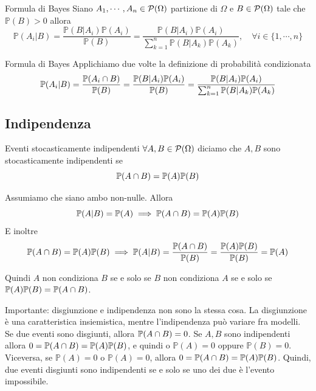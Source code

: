 \documentclass[a4paper]{article}
\begin{document}
\begin{snippettheorem}{Formula di Bayes}
    Siano \(A_1, \cdots, A_n \in \mathcal P(\Omega)\) partizione di \(\Omega\)
    e \(B \in \mathcal P(\Omega)\) tale che \(\mathbb P(B) > 0\) allora
    \[
        \mathbb P(A_i | B) = \frac{
            \mathbb P(B | A_i) \mathbb P(A_i)
        }{
            \mathbb P(B)
        } = \frac{
            \mathbb P(B|A_i) \mathbb P(A_i)
        }{
            \sum_{k=1}^n \mathbb P(B | A_k) \mathbb P(A_k)
        }, \quad \forall i \in \{1, \cdots, n\}
    \]
\end{snippettheorem}

\begin{snippetproof}{Formula di Bayes}
    Applichiamo due volte la definizione di probabilità condizionata
    \[
        \mathbb P(A_i | B) =
        \frac{
            \mathbb P(A_i \cap B)
        }{
            \mathbb P(B)
        } = \frac{
            \mathbb P(B | A_i) \mathbb P(A_i)
        }{
            \mathbb P(B)
        } = \frac{
            \mathbb P(B|A_i)\mathbb P(A_i)
        }{
            \sum_{k=1}^n \mathbb P(B|A_k)\mathbb P(A_k)
        }
    \]
\end{snippetproof}

\subsection{Indipendenza}

\begin{snippetdefinition}{Eventi stocasticamente indipendenti}
    \(\forall A,B \in \mathcal P(\Omega)\) diciamo che \(A,B\)
    sono stocasticamente indipendenti se
    \[
        \mathbb P(A \cap B) = \mathbb P(A) \mathbb P(B)
    \]
\end{snippetdefinition}

Assumiamo che siano ambo non-nulle.
Allora
\[
    \mathbb P(A | B) = \mathbb P(A) \implies \mathbb P(A \cap B) = \mathbb P(A) \mathbb P(B)
\]
E inoltre
\[
    \mathbb P(A \cap B) =
    \mathbb P(A) \mathbb P(B) \implies \mathbb P(A | B) = \frac{\mathbb P(A \cap B)}{\mathbb P(B)} =
    \frac{\mathbb P(A)\mathbb P(B)}{\mathbb P(B)} = \mathbb P(A)
\]

Quindi \(A\) non condiziona \(B\)
se e solo se \(B\) non condiziona \(A\)
se e solo se \(\mathbb P(A)\mathbb P(B) = \mathbb P(A \cap B)\).

Importante: disgiunzione e indipendenza non sono la stessa cosa.
La disgiunzione è una caratteristica insiemistica, mentre l'indipendenza può variare
fra modelli. Se due eventi sono disgiunti, allora \(\mathbb P(A \cap B) = 0\).
Se \(A,B\) sono indipendenti allora \(0 = \mathbb P(A \cap B) = \mathbb P(A)\mathbb P(B)\),
e quindi o \(\mathbb P(A) = 0\) oppure \(\mathbb P(B) = 0\).
Viceversa, se \(\mathbb P(A) = 0\) o \(\mathbb P(A) = 0\), allora
\(0 = \mathbb P(A \cap B) = \mathbb P(A)\mathbb P(B)\).
Quindi, due eventi disgiunti sono indipendenti se e solo se uno dei due è l'evento impossibile.
\end{document}
